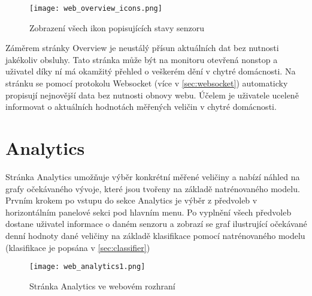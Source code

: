 \begin{figure}[H]
  \centering
  \texttt{[image: web\_overview\_icons.png]}
  \caption{Zobrazení všech ikon popisujících stavy senzoru}
  \label{fig:web_overview_icons}
\end{figure}

Záměrem stránky Overview je neustálý přísun aktuálních dat bez nutnosti jakékoliv obsluhy. Tato stránka může být na monitoru otevřená nonstop a uživatel díky ní má okamžitý přehled o veškerém dění v chytré domácnosti. Na stránku se pomocí protokolu Websocket (více v \cref{sec:websocket}) automaticky propisují nejnovější data bez nutnosti obnovy webu. Účelem je uživatele uceleně informovat o aktuálních hodnotách měřených veličin v chytré domácnosti.

\section{Analytics} \label{sec:analytics}

Stránka Analytics umožňuje výběr konkrétní měřené veličiny a nabízí náhled na grafy očekávaného vývoje, které jsou tvořeny na základě natrénovaného modelu. Prvním krokem po vstupu do sekce Analytics je výběr z předvoleb v horizontálním panelové sekci pod hlavním menu. Po vyplnění všech předvoleb dostane uživatel informace o daném senzoru a zobrazí se graf ilustrující očekávané denní hodnoty dané veličiny na základě klasifikace pomocí natrénovaného modelu (klasifikace je popsána v \cref{sec:classifier})

\begin{figure}[H]
  \centering
  \texttt{[image: web\_analytics1.png]}
  \caption{Stránka Analytics ve webovém rozhraní}
  \label{fig:web_analytics1}
\end{figure}

